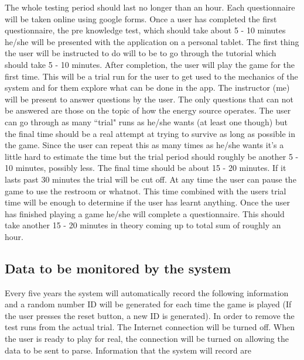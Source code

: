 \documentclass[msc,oneside]{ubcthesis}%
\begin{document}
    The whole testing period should last no longer than an hour. Each questionnaire will be taken online using google forms. Once a user has completed the first questionnaire, the pre knowledge test, which should take about 5 - 10 minutes he/she will be presented with the application on a personal tablet. The first thing the user will be instructed to do will to be to go through the tutorial which should take 5 - 10 minutes. After completion, the user will play the game for the first time. This will be a trial run for the user to get used to the mechanics of the system and for them explore what can be done in the app. The instructor (me) will be present to answer questions by the user. The only questions that can not be answered are those on the topic of how the energy source operates. The user can go through as many ``trial" runs as he/she wants (at least one though) but the final time should be a real attempt at trying to survive as long as possible in the game. Since the user can repeat this as many times as he/she wants it's a little hard to estimate the time but the trial period should roughly be another 5 - 10 minutes, possibly less. The final time should be about 15 - 20 minutes. If it lasts past 30 minutes the trial will be cut off. At any time the user can pause the game to use the restroom or whatnot. This time combined with the users trial time will be enough to determine if the user has learnt anything. Once the user has finished playing a game he/she will complete a questionnaire. This should take another 15 - 20 minutes in theory coming up to total sum of roughly an hour. 

  \subsection{Data to be monitored by the system}
  Every five years the system will automatically record the following information and a random number ID will be generated for each time the game is played (If the user presses the reset button, a new ID is generated). In order to remove the test runs from the actual trial. The Internet connection will be turned off. When the user is ready to play for real, the connection will be turned on allowing the data to be sent to parse. Information that the system will record are
\end{document}
